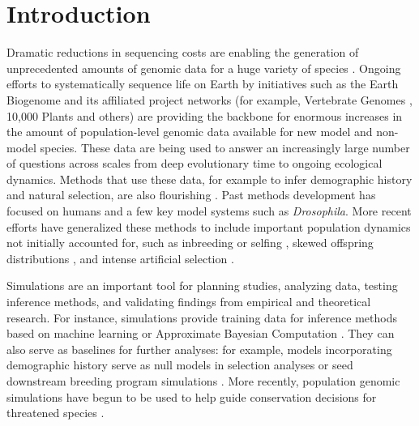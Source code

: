 \documentclass[hidelinks]{article}
\begin{document}
\hypertarget{introduction}{%
\section*{Introduction}\label{introduction}}

Dramatic reductions in sequencing costs are enabling the generation of
unprecedented amounts of genomic data for a huge variety of species
\citep{Ellegren2014}. Ongoing efforts to systematically sequence life on
Earth by initiatives such as the Earth Biogenome \citep{Lewin2022} and its
affiliated project networks (for example, Vertebrate Genomes
\citep{Rhie2021}, 10,000 Plants \citep{Cheng2018} and others) are
providing the backbone for enormous increases in the amount of population-level genomic data
available for new model and non-model species.
These data are being used to answer an increasingly large number of questions across scales
from deep evolutionary time to ongoing ecological dynamics.
Methods that use these data, for example to infer demographic history and natural selection,
are also flourishing \citep{Beichman2018}.
Past methods development has focused on humans and a few key model systems such as \emph{Drosophila}.
More recent efforts have
generalized these methods to include important population dynamics not initially accounted for,
such as inbreeding or selfing \citep{Blischak2020}, skewed offspring
distributions \citep{Montano2016}, and intense artificial selection \citep{MacLeod2013, MacLeod2014}.

Simulations are an important tool for planning studies, analyzing data, testing inference methods,
and validating findings from empirical and theoretical research.
For instance, simulations provide training data
for inference methods based on machine learning \citep{Schrider2018} or
Approximate Bayesian Computation \citep{Csillery2010}. They can also serve as
baselines for further analyses: for example, models incorporating
demographic history serve as null models in selection analyses
\citep{Hsieh2016a} or seed downstream breeding program simulations
\citep{Gaynor2020}. More recently, population genomic simulations have begun
to be used to help guide conservation decisions for threatened species
\citep{Teixeira2021}.
\end{document}
